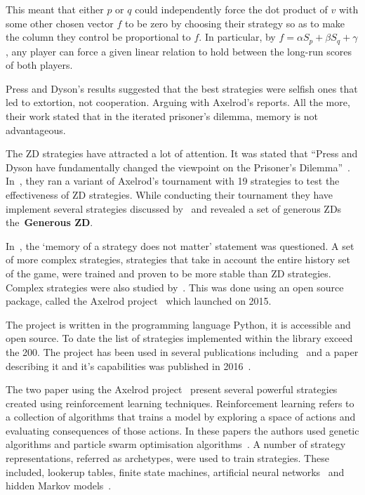 \documentclass{article}
\theoremstyle{definition}
\begin{document}
This meant that either \(p\) or \(q\) could independently force the dot product
of \(v\) with some other chosen vector \(f\) to be zero by choosing their
strategy so as to make the column they control be proportional to \(f\).
In particular, by \( f = \alpha S_p + \beta S_q + \gamma\), any player can force
a given linear relation to hold between the long-run scores of both players.


Press and Dyson's results suggested that the best strategies were selfish ones
that led to extortion, not cooperation. Arguing with Axelrod's reports.
All the more, their work stated that in the iterated prisoner's dilemma, memory
is not advantageous.


The ZD strategies have attracted a lot of attention. It was stated that
``Press and Dyson have fundamentally changed the viewpoint on the Prisoner's
Dilemma''~\cite{Stewart2012}. In~\cite{Stewart2012}, they ran a variant of
Axelrod's tournament with 19 strategies to test the effectiveness of 
ZD strategies. While conducting their tournament they have implement several
strategies discussed by~\cite{Press2012} and revealed a set of generous ZDs
the~\textbf{Generous ZD}.


In~\cite{Lee2015}, the `memory of a strategy does not matter' statement was
questioned. A set of more complex strategies, strategies that take in account
the entire history set of the game, were trained and proven to be more stable than
ZD strategies. Complex strategies were also studied by~\cite{Knight2017,KnightHGC17}.
This was done using an open source package, called the Axelrod project~\cite{axelrodproject}
which launched on 2015.


The project is written in the programming language
Python, it is accessible and open source. To date the list of strategies implemented
within the library exceed the 200. The project has been used in several
publications including~\cite{Knight2017} and a paper describing it and
it's capabilities was published in 2016~\cite{Knight2016}.


The two paper using the Axelrod project~\cite{Knight2017, KnightHGC17} present
several powerful strategies created using reinforcement learning techniques.
Reinforcement learning refers to a collection of algorithms that trains a model by
exploring a space of actions and evaluating consequences of those actions. In these
papers the authors used genetic algorithms and particle swarm optimisation
algorithms~\cite{suganthan1999}. A number of strategy representations, referred as
archetypes, were used to train strategies. These included, lookerup tables,
finite state machines, artificial neural networks~\cite{yegnanarayana2009} and
hidden Markov models~\cite{eddy1996}.
\end{document}
